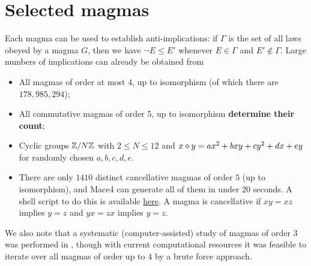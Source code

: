 \chapter{Selected magmas}\label{selected-magmas-chapter}

Each magma can be used to establish anti-implications: if $\Gamma$ is the set of all laws obeyed by a magma $G$, then we have $\neg E \leq E'$ whenever $E \in \Gamma$ and $E' \not \in \Gamma$.  Large numbers of implications can already be obtained from

\begin{itemize}
  \item All magmas of order at most $4$, up to isomorphism (of which there are $178,985,294$);
  \item All commutative magmas of order $5$, up to isomorphism {\bf determine their count};
  \item Cyclic groups $\mathbb{Z}/N\mathbb{Z}$ with $2 \leq N \leq 12$ and $x \diamond y = ax^2+bxy+cy^2+dx+ey$ for randomly chosen $a,b,c,d,e$.
  \item There are only $1410$ distinct cancellative magmas of order $5$ (up to isomorphism), and Mace4 can generate all of them in under 20 seconds. A shell script to do this is available \href{https://github.com/zaklogician/equational_theories/tree/cancellative_magmas/scripts/cancellative_magmas}{here}. A magma is cancellative if $xy=xz$ implies $y=z$ and $yx=zx$ implies $y=z$.
\end{itemize}

We also note that a systematic (computer-assisted) study of magmas of order $3$ was performed in \cite{berman-burris}, though with current computational resources it was feasible to iterate over all magmas of order up to $4$ by a brute force approach.

